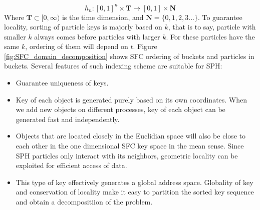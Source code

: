 \documentclass[procedia]{easychair}
\begin{document}
\begin{equation}
h_n: [0,1]^n \times \textbf{T} \rightarrow [0,1] \times \textbf{N}
\end{equation}
Where $\textbf{T} \subset [0,\infty)$ is the time dimension, and $\textbf{N}=\lbrace 0, 1, 2, 3...\rbrace$.
To guarantee locality, sorting of particle keys is majorly based on $k$, that is to say, particle with smaller $k$ always comes before particles with larger $k$. For these particles have the same $k$, ordering of them will depend on $t$. Figure \ref{fig:SFC_domain_decomposition} shows SFC ordering of buckets and particles in buckets. 
Several features of such indexing scheme are suitable for SPH:
\begin{itemize}
\item Guarantee uniqueness of keys.
\item Key of each object is generated purely based on its own coordinates. When we add new objects on different processes, key of each object can be generated fast and independently.
\item Objects that are located closely in the Euclidian space will also be close to each other in the one dimensional SFC key space in the mean sense. Since SPH particles only interact with its neighbors, geometric locality can be exploited for efficient access of data.
\item This type of key effectively generates a global address space. Globality of key and conservation of locality make it easy to partition the sorted key sequence and obtain a decompositiion of the problem.
\end{itemize}
\end{document}

